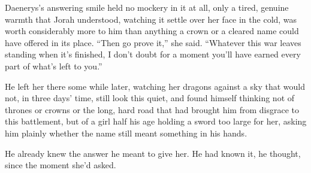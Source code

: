 Daenerys’s answering smile held no mockery in it at all, only a tired, genuine warmth that Jorah understood, watching it settle over her face in the cold, was worth considerably more to him than anything a crown or a cleared name could have offered in its place. “Then go prove it,” she said. “Whatever this war leaves standing when it’s finished, I don’t doubt for a moment you’ll have earned every part of what’s left to you.”

He left her there some while later, watching her dragons against a sky that would not, in three days’ time, still look this quiet, and found himself thinking not of thrones or crowns or the long, hard road that had brought him from disgrace to this battlement, but of a girl half his age holding a sword too large for her, asking him plainly whether the name still meant something in his hands.

He already knew the answer he meant to give her. He had known it, he thought, since the moment she’d asked.